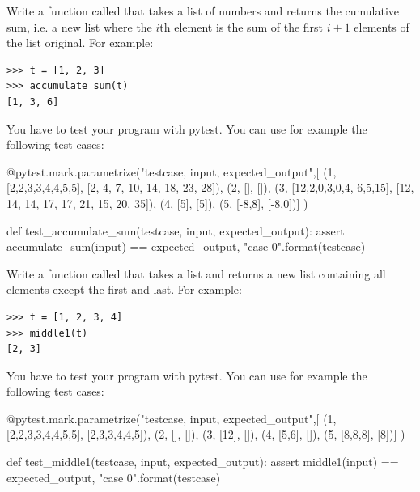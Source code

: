\begin{exercise}
\label{cumulative}

Write a function called  that takes a list of numbers and returns the cumulative sum, i.e. a new list where the $i$th element is the sum of the first $i+1$ elements of the list original. For example:

\begin{Verbatim}[frame=single]
>>> t = [1, 2, 3]
>>> accumulate_sum(t)
[1, 3, 6]
\end{Verbatim}

You have to test your program with pytest. You can use for example the following test cases:

\begin{python}
@pytest.mark.parametrize("testcase, input, expected_output",[
(1, [2,2,3,3,4,4,5,5], [2, 4, 7, 10, 14, 18, 23, 28]),   
(2, [], []),              
(3, [12,2,0,3,0,4,-6,5,15], [12, 14, 14, 17, 17, 21, 15, 20, 35]),
(4, [5], [5]),
(5, [-8,8], [-8,0])]
)              

def test_accumulate_sum(testcase, input, expected_output):
    assert accumulate_sum(input) == expected_output, "case {0}".format(testcase)
\end{python}


\end{exercise}

\begin{exercise}

Write a function called  that takes a list and returns a new list containing all elements except the first and last. For example:

\begin{Verbatim}[frame=single]
>>> t = [1, 2, 3, 4]
>>> middle1(t)
[2, 3]
\end{Verbatim}

You have to test your program with pytest. You can use for example the following test cases:

\begin{python}
@pytest.mark.parametrize("testcase, input, expected_output",[
(1, [2,2,3,3,4,4,5,5], [2,3,3,4,4,5]),   
(2, [], []),              
(3, [12], []),
(4, [5,6], []),
(5, [8,8,8], [8])]
)              

def test_middle1(testcase, input, expected_output):
    assert middle1(input) == expected_output, "case {0}".format(testcase)
\end{python}

\end{exercise}

